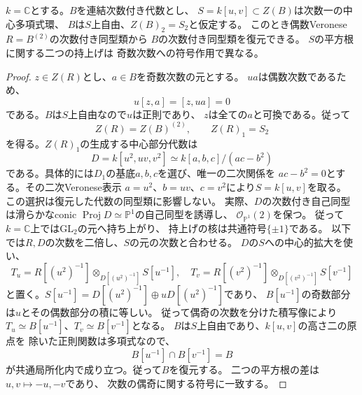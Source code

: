 \begin{proposition}[二変数中心による偶数Veronese復元]
\label{prop:pg-ambient-even}
$k=\mathbb C$とする。$B$を連結次数付き代数とし、
$S=k[u,v]\subset Z(B)$は次数一の中心多項式環、
$B$は$S$上自由、$Z(B)_2=S_2$と仮定する。
このとき偶数Veronese $R=B^{(2)}$の次数付き同型類から
$B$の次数付き同型類を復元できる。
$S$の平方根に関する二つの持上げは
奇数次数への符号作用で異なる。
\end{proposition}
\begin{proof}
$z\in Z(R)$とし、$a\in B$を奇数次数の元とする。
$ua$は偶数次数であるため、
\begin{equation}\label{eq:pg-ambient-even-center-comm}
 u[z,a]=[z,ua]=0
\end{equation}
である。$B$は$S$上自由なので$u$は正則であり、
$z$は全ての$a$と可換である。従って
\begin{equation}\label{eq:pg-ambient-even-center}
 Z(R)=Z(B)^{(2)},\qquad
 Z(R)_1=S_2
\end{equation}
を得る。$Z(R)_1$の生成する中心部分代数は
\begin{equation}\label{eq:pg-ambient-conic}
 D=k[u^2,uv,v^2]
 \simeq k[a,b,c]/(ac-b^2)
\end{equation}
である。具体的には$D_1$の基底$a,b,c$を選び、唯一の二次関係を
$ac-b^2=0$とする。その二次Veronese表示
$a=u^2$、$b=uv$、$c=v^2$により$S=k[u,v]$を取る。
この選択は復元した代数の同型類に影響しない。
実際、$D$の次数付き自己同型は滑らかなconic
$\operatorname{Proj}D\simeq\mathbb P^1$の自己同型を誘導し、
$\mathcal O_{\mathbb P^1}(2)$を保つ。
従って$k=\mathbb C$上では$\mathrm{GL}_2$の元へ持ち上がり、
持上げの核は共通符号$\{\pm1\}$である。
以下では$R,D$の次数を二倍し、$S$の元の次数と合わせる。
$D$の$S$への中心的拡大を使い、
\begin{equation}\label{eq:pg-ambient-even-localizations}
 T_u=R[(u^2)^{-1}]
       \otimes_{D[(u^2)^{-1}]}S[u^{-1}],
 \quad
 T_v=R[(v^2)^{-1}]
       \otimes_{D[(v^2)^{-1}]}S[v^{-1}]
\end{equation}
と置く。$S[u^{-1}]=D[(u^2)^{-1}]\oplus uD[(u^2)^{-1}]$であり、
$B[u^{-1}]$の奇数部分は$u$とその偶数部分の積に等しい。
従って偶奇の次数を分けた積写像により
$T_u\simeq B[u^{-1}]$、$T_v\simeq B[v^{-1}]$となる。
$B$は$S$上自由であり、$k[u,v]$の高さ二の原点を
除いた正則関数は多項式なので、
\begin{equation}\label{eq:pg-ambient-even-intersection}
 B[u^{-1}]\cap B[v^{-1}]=B
\end{equation}
が共通局所化内で成り立つ。従って$B$を復元する。
二つの平方根の差は$u,v\mapsto-u,-v$であり、
次数の偶奇に関する符号に一致する。
\end{proof}


